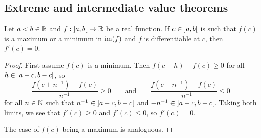 \subsection{Extreme and intermediate value theorems}
\begin{theorem} \label{fermatsTheorem}
Let $a<b\in \mathbb{R}$ and $f: \interval[o]{a,b}\to \R$ be a real function. If $c\in \interval[o]{a,b}$ is such that $f(c)$ is a maximum or a minimum in $\operatorname{im}(f)$ and $f$ is differentiable at $c$, then $f'(c) = 0$.
\end{theorem}
\begin{proof}
First assume $f(c)$ is a minimum. Then $f(c+h)-f(c) \geq 0$ for all $h\in \interval[o]{a-c, b-c}$, so
\[ \frac{f(c+n^{-1})-f(c)}{n^{-1}} \geq 0 \qquad\text{and}\qquad \frac{f(c-n^{-1})-f(c)}{-n^{-1}} \leq 0 \]
for all $n\in \mathbb{N}$ such that $n^{-1}\in \interval[o]{a-c, b-c}$ and $-n^{-1}\in \interval[o]{a-c, b-c}$. Taking both limits, we see that $f'(c) \geq 0$ and $f'(c) \leq 0$, so $f'(c) = 0$.

The case of $f(c)$ being a maximum is analoguous.
\end{proof}

